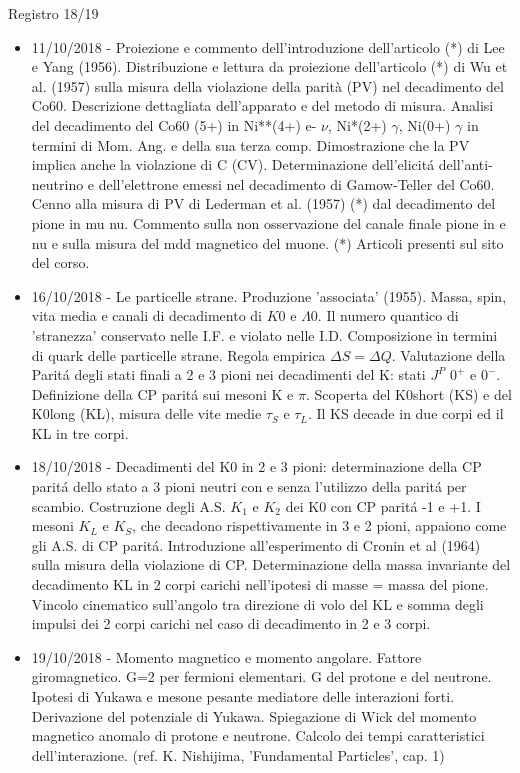 \begin{frame}[allowframebreaks]{Registro 18/19}
\begin{itemize}
\item 11/10/2018 - Proiezione e commento dell'introduzione dell'articolo (*) di Lee e Yang (1956). Distribuzione e lettura da proiezione dell'articolo (*) di Wu et al. (1957) sulla misura della violazione della parità (PV) nel decadimento del Co60. Descrizione dettagliata dell'apparato e del metodo di misura. Analisi del decadimento del Co60 (5+) in Ni**(4+) e- $\nu$, Ni*(2+) $\gamma$, Ni(0+) $\gamma$ in termini di Mom. Ang. e della sua terza comp. Dimostrazione che la PV implica anche la violazione di C (CV). Determinazione dell'elicit\'a dell'anti-neutrino e dell'elettrone emessi nel decadimento di Gamow-Teller del Co60. Cenno alla misura di PV di Lederman et al. (1957) (*) dal decadimento del pione in mu nu. Commento sulla non osservazione del canale finale pione in e nu e sulla misura del mdd magnetico del muone. (*) Articoli presenti sul sito del corso.
\item 16/10/2018 - Le particelle strane. Produzione 'associata' (1955). Massa, spin, vita media e canali di decadimento di $K0$ e $\Lambda0$. Il numero quantico di 'stranezza' conservato nelle I.F. e violato nelle I.D. Composizione in termini di quark delle particelle strane. Regola empirica $\Delta S=\Delta Q$. Valutazione della Parit\'a degli stati finali a 2 e 3 pioni nei decadimenti del K: stati $J^P$ $0^+$ e $0^-$. Definizione della CP parit\'a sui mesoni K e $\pi$. Scoperta del K0short (KS) e del K0long (KL), misura delle vite medie $\tau_S$ e $\tau_L$. Il KS decade in due corpi ed il KL in tre corpi.
\item 18/10/2018 - Decadimenti del K0 in 2 e 3 pioni: determinazione della CP parit\'a dello stato a 3 pioni neutri con e senza l'utilizzo della parit\'a per scambio. Costruzione degli A.S. $K_1$ e $K_2$ dei K0 con CP parit\'a -1 e +1. I mesoni $K_L$ e $K_S$, che decadono rispettivamente in 3 e 2 pioni, appaiono come gli A.S. di CP parit\'a. Introduzione all'esperimento di Cronin et al (1964) sulla misura della violazione di CP. Determinazione della massa invariante del decadimento KL in 2 corpi carichi nell'ipotesi di masse = massa del pione. Vincolo cinematico sull'angolo tra direzione di volo del KL e somma degli impulsi dei 2 corpi carichi nel caso di decadimento in 2 e 3 corpi.
\item 19/10/2018 - Momento magnetico e momento angolare. Fattore giromagnetico. G=2 per fermioni elementari. G del protone e del neutrone. Ipotesi di Yukawa e mesone pesante mediatore delle interazioni forti. Derivazione del potenziale di Yukawa. Spiegazione di Wick del momento magnetico anomalo di protone e neutrone. Calcolo dei tempi caratteristici dell'interazione. (ref. K. Nishijima, 'Fundamental Particles', cap. 1)

\end{itemize}
\end{frame}

